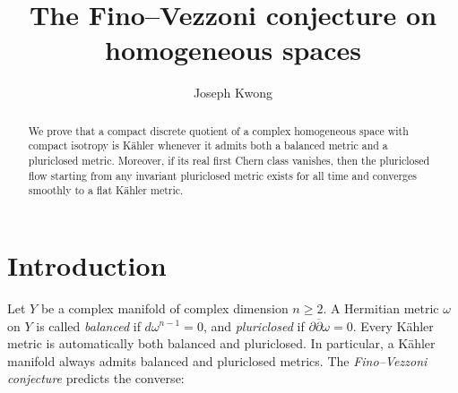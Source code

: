 \documentclass[11pt,reqno]{amsart}
\title{The Fino--Vezzoni conjecture on homogeneous spaces}
\author{Joseph Kwong}
\theoremstyle{plain}
\theoremstyle{definition}
\theoremstyle{remark}
\begin{document}
\begin{abstract}
   We prove that a compact discrete quotient of a complex homogeneous space with compact isotropy is K\"ahler whenever it admits both a balanced metric and a pluriclosed metric. Moreover, if its real first Chern class vanishes, then the pluriclosed flow starting from any invariant pluriclosed metric exists for all time and converges smoothly to a flat K\"ahler metric.
\end{abstract}
\maketitle

\section{Introduction}
Let $Y$ be a complex manifold of complex dimension $n \geq 2$. A Hermitian metric $\omega$ on $Y$ is called \textit{balanced} if $d \omega^{n-1} = 0$, and \textit{pluriclosed} if $\partial \overline \partial \omega = 0$. Every
K\"ahler metric is automatically both balanced and pluriclosed. In particular, a K\"ahler manifold always admits balanced and pluriclosed metrics. The \textit{Fino--Vezzoni conjecture} \cite[Problem 3]{fino_2015} predicts the converse:
\end{document}
